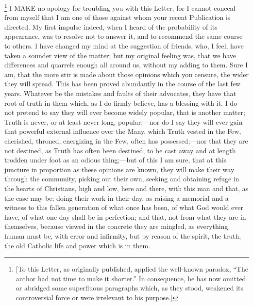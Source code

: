 \footnote{[To this Letter, as originally published,
applied the well-known paradox, ``The author had not time to make it
shorter.'' In consequence, he has now omitted or abridged some
superfluous paragraphs which, as they stood, weakened its
controversial force or were irrelevant to his purpose.]} I MAKE no apology
for troubling you with this Letter, for I cannot conceal from myself
that I am one of those against whom your recent Publication is
directed. My first impulse indeed, when I heard of the probability of
its appearance, was to resolve not to answer it, and to recommend the
same course to others. I have changed my mind at the suggestion of
friends, who, I feel, have taken a sounder view of the matter; but my
original feeling was, that we have differences and quarrels enough all
around us, without my adding to them. Sure I am, that the more stir is
made about those opinions which you censure, the wider they will
spread. This has been proved abundantly in the course of the last few
years. Whatever be the mistakes and faults of their advocates, they
have that root of truth in them which, as I do firmly believe, has a
blessing with it. I do not pretend to say they will ever become widely
popular, that is another matter; Truth is never, or at least never
long, popular;—nor do I say they will ever gain that powerful
external influence over the Many, which Truth vested in the Few, cherished, throned, energizing in the Few, often has possessed;—nor
that they are not destined, as Truth has often been destined, to be
cast away and at length trodden under foot as an odious thing;—but
of this I am sure, that at this juncture in proportion as these
opinions are known, they will make their way through the community,
picking out their own, seeking and obtaining refuge in the hearts of
Christians, high and low, here and there, with this man and that, as
the case may be; doing their work in their day, as raising a memorial
and a witness to this fallen generation of what once has been, of what
God would ever have, of what one day shall be in perfection; and that,
not from what they are in themselves, because viewed in the concrete
they are mingled, as everything human must be, with error and
infirmity, but by reason of the spirit, the truth, the old Catholic
life and power which is in them.


